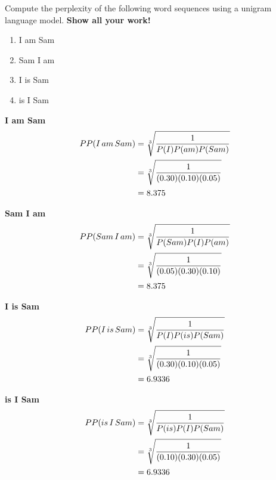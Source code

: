 \documentclass[11pt]{article}
\begin{document}
\begin{enumerate}
Compute the perplexity of the following word sequences using a unigram
language model.  {\bf Show all your work!}

\begin{enumerate}
\item I am Sam

\item Sam I am

\item I is Sam

\item is I Sam

\end{enumerate}



 \bf I am Sam \\
\begin{equation*}
   \begin{split}
   PP(I\thinspace am  \thinspace Sam) & = \sqrt[3]{\frac{1}{P(I) P(am) P(Sam)}} \\ 
                 &  = \sqrt[3]{\frac{1}{(0.30) (0.10) (0.05)}}  \\
                 &= 8.375 \\
\end{split}
\end{equation*}

 \bf Sam I am\\
\begin{equation*}
   \begin{split}
   PP(Sam\thinspace I  \thinspace am) & = \sqrt[3]{\frac{1}{P(Sam) P(I) P(am)}} \\ 
                 &  = \sqrt[3]{\frac{1}{(0.05) (0.30) (0.10)}}  \\
                 &= 8.375 \\
\end{split}
\end{equation*}


\bf I is Sam\\
\begin{equation*}
   \begin{split}
   PP(I \thinspace is \thinspace Sam) & = \sqrt[3]{\frac{1}{P(I) P(is) P(Sam)}} \\ 
                 &  = \sqrt[3]{\frac{1}{(0.30) (0.10) (0.05)}}  \\
                 &= 6.9336 \\
\end{split}
\end{equation*}

\bf is I Sam\\
\begin{equation*}
   \begin{split}
   PP(is  \thinspace I  \thinspace Sam) & = \sqrt[3]{\frac{1}{P(is) P(I) P(Sam)}} \\ 
                 &  = \sqrt[3]{\frac{1}{(0.10) (0.30) (0.05)}}  \\
                 &= 6.9336 \\
\end{split}
\end{equation*}


\end{enumerate}
\end{document}

